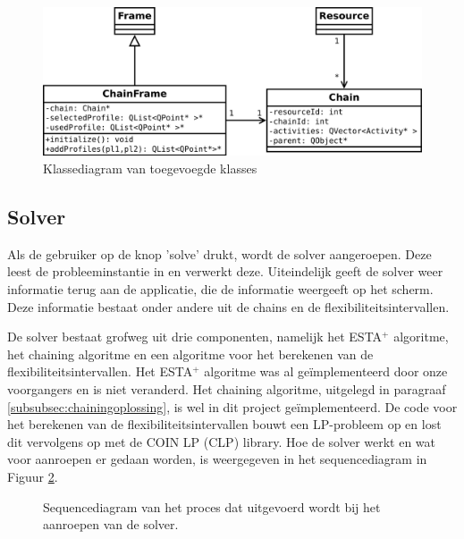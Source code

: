 \begin{figure}[H]
\centering
\includegraphics[width=.95\textwidth]{../images/klasse-diagram.png}
\caption{Klassediagram van toegevoegde klasses}
\label{fig:klassediagram}
\end{figure}

\subsection{Solver}
Als de gebruiker op de knop 'solve' drukt, wordt de solver aangeroepen. Deze leest de probleeminstantie in en verwerkt deze. Uiteindelijk geeft de solver weer informatie terug aan de applicatie, die de informatie weergeeft op het scherm. Deze informatie bestaat onder andere uit de chains en de flexibiliteitsintervallen.

De solver bestaat grofweg uit drie componenten, namelijk het ESTA$^+$ algoritme, het chaining algoritme en een algoritme voor het berekenen van de flexibiliteitsintervallen. Het ESTA$^+$ algoritme was al ge\"implementeerd door onze voorgangers en is niet veranderd. Het chaining algoritme, uitgelegd in paragraaf \ref{subsubsec:chainingoplossing}, is wel in dit project ge\"implementeerd. De code voor het berekenen van de flexibiliteitsintervallen bouwt een LP-probleem op en lost dit vervolgens op met de COIN LP (CLP) library. Hoe de solver werkt en wat voor aanroepen er gedaan worden, is weergegeven in het sequencediagram in Figuur \ref{fig:sd}.

\newpage
\begin{figure}[H]
\centering

\caption{Sequencediagram van het proces dat uitgevoerd wordt bij het aanroepen van de solver.} 
\label{fig:sd}
\end{figure}

\newpage
